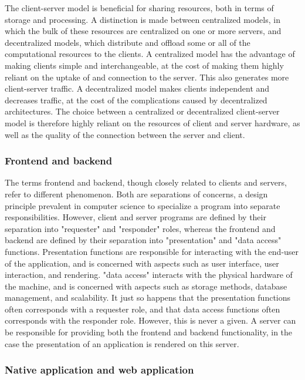 The client-server model is beneficial for sharing resources, both in terms of storage and processing. 
A distinction is made between centralized models, in which the bulk of these resources are centralized on one or more servers, and decentralized models, which distribute and offload some or all of the computational resources to the clients. 
A centralized model has the advantage of making clients simple and interchangeable, at the cost of making them highly reliant on the uptake of and connection to the server. This also generates more client-server traffic. 
A decentralized model makes clients independent and decreases traffic, at the cost of the complications caused by decentralized architectures. 
The choice between a centralized or decentralized client-server model is therefore highly reliant on the resources of client and server hardware, as well as the quality of the connection between the server and client.  

\subsubsection*{Frontend and backend}

The terms frontend and backend, though closely related to clients and servers, refer to different phenomenon. 
Both are separations of concerns, a design principle prevalent in computer science to specialize a program into separate responsibilities. 
However, client and server programs are defined by their separation into "requester" and "responder" roles, whereas the frontend and backend are defined by their separation into "presentation" and "data access" functions. 
Presentation functions are responsible for interacting with the end-user of the application, and is concerned with aspects such as user interface, user interaction, and rendering.
"data access" interacts with the physical hardware of the machine, and is concerned with aspects such as storage methods, database management, and scalability.  
It just so happens that the presentation functions often corresponds with a requester role,
and that data access functions often corresponds with the responder role.
However, this is never a given. 
A server can be responsible for providing both the frontend and backend functionality, in the case the presentation of an application is rendered on this server. 

\subsubsection*{Native application and web application}

